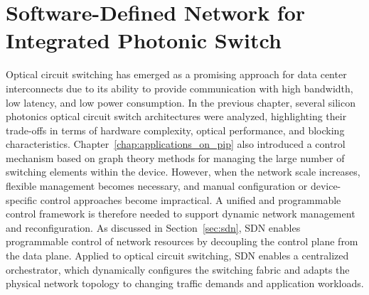 

\chapter[Software-Defined Network for Integrated Photonic Switch]{
  Software-Defined Network for Integrated Photonic Switch
 }\label{chap:sdn_for_ocs} %
Optical circuit switching has emerged as a promising approach for data center interconnects due to its ability to provide communication with high bandwidth, low latency, and low power consumption.
In the previous chapter, several silicon photonics optical circuit switch architectures were analyzed, highlighting their trade-offs in terms of hardware complexity, optical performance, and blocking characteristics.
Chapter~\ref{chap:applications_on_pip} also introduced a control mechanism based on graph theory methods for managing the large number of switching elements within the device.
However, when the network scale increases, flexible management becomes necessary, and manual configuration or device-specific control approaches become impractical.
A unified and programmable control framework is therefore needed to support dynamic network management and reconfiguration.
As discussed in Section~\ref{sec:sdn}, SDN enables programmable control of network resources by decoupling the control plane from the data plane.
Applied to optical circuit switching, SDN enables a centralized orchestrator, which dynamically configures the switching fabric and adapts the physical network topology to changing traffic demands and application workloads.


